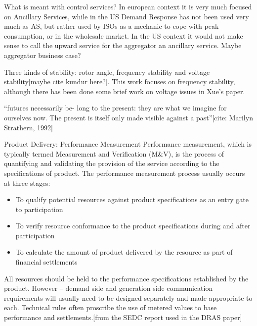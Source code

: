 What is meant with control services? In european context it is very much focused on Ancillary Services, while in the US Demand Response has not been used very much as AS, but rather used by ISOs as a mechanic to cope with peak consumption, or in the wholesale market. In the US context it would not make sense to call the upward service for the aggregator an ancillary service. Maybe aggregator business case?

Three kinds of stability: rotor angle, frequency stability and voltage stability[maybe cite kundur here?]. This work focuses on frequency stability, although there has been done some brief work on voltage issues in Xue's paper. 

``futures necessarily be- long to the present: they are what we imagine for ourselves now. The present is itself only made visible against a past''[cite: Marilyn Strathern, 1992]

Product Delivery: Performance Measurement 
Performance measurement, which is typically termed Measurement and Verification (M\&V), is the process of quantifying and validating the provision of the service according to the specifications of product. The performance measurement process usually occurs at three stages: 
\begin{itemize}
	\item To qualify potential resources against product specifications as an entry gate to participation 
	\item To verify resource conformance to the product specifications during and after participation 
	\item To calculate the amount of product delivered by the resource as part of financial settlements
\end{itemize}
 
All resources should be held to the performance specifications established by the product. However – demand side and generation side communication requirements will usually need to be designed separately and made appropriate to each. Technical rules often proscribe the use of metered values to base performance and settlements.[from the SEDC report used in the DRAS paper]



